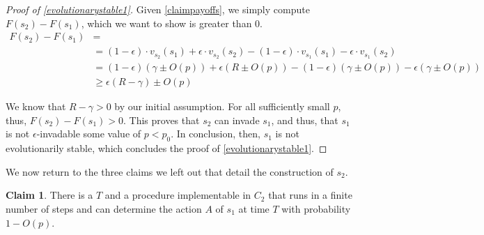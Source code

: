 \documentclass[11pt]{amsart}
\theoremstyle{definition}
\newtheorem{claim}[theorem]{Claim}
\theoremstyle{remark}
\begin{document}
\begin{proof}[Proof of \cref{evolutionarystable1}]
      Given \cref{claimpayoffs}, we simply compute $F(s_2) - F(s_1)$, which we want to show is greater than 0.
      \begin{align*}
        F(s_2) - F(s_1) &= \\
        &= (1 - \epsilon) \cdot v_{s_2}(s_1) + \epsilon \cdot v_{s_2}(s_2) - (1 - \epsilon) \cdot v_{s_1}(s_1) - \epsilon \cdot v_{s_1}(s_2) \\
        &= (1 - \epsilon) (\gamma \pm O(p)) + \epsilon (R \pm O(p)) - (1-\epsilon) (\gamma \pm O(p)) - \epsilon (\gamma \pm O(p)) \\
        &\geq \epsilon (R - \gamma) \pm O(p)
      \end{align*}

      We know that $R - \gamma > 0$ by our initial assumption. For all sufficiently small $p$, thus, $F(s_2) - F(s_1) > 0$. This proves that $s_2$ can invade $s_1$, and thus, that $s_1$ is not $\epsilon$-invadable some value of $p < p_0$. In conclusion, then, $s_1$ is not evolutionarily stable, which concludes the proof of \cref{evolutionarystable1}.

    \end{proof}

      We now return to the three claims we left out that detail the construction of $s_2$.

      \begin{claim}
        There is a $T$ and a procedure implementable in $C_2$ that runs in a finite number of steps and can determine the action $A$ of $s_1$ at time $T$ with probability $1 - O(p)$.
      \end{claim}
\end{document}
